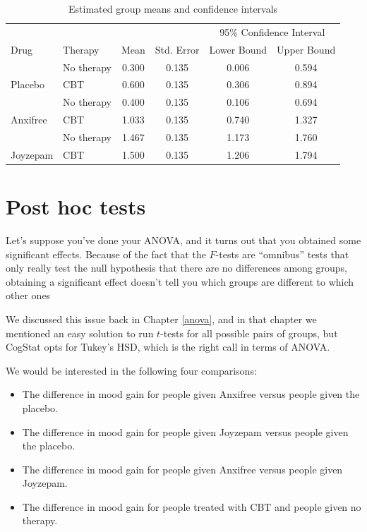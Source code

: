 \documentclass[
  11pt,
  a4paper,
  twoside,symmetric,openright]{book}
\providecommand{\tightlist}{%
  \setlength{\itemsep}{0pt}\setlength{\parskip}{0pt}}
\theoremstyle{break}
\theoremstyle{break}
\begin{document}
\begin{table}[!h]

\caption{\label{tab:unnamed-chunk-89}Estimated group means and confidence intervals}
\centering
\begin{tabular}[t]{llcccc}
\toprule
\multicolumn{1}{c}{ } & \multicolumn{1}{c}{ } & \multicolumn{1}{c}{ } & \multicolumn{1}{c}{ } & \multicolumn{2}{c}{95\% Confidence Interval} \\
\cmidrule(l{3pt}r{3pt}){5-6}
Drug & Therapy & Mean & Std. Error & Lower Bound & Upper Bound\\
\midrule
 & No therapy & 0.300 & 0.135 & 0.006 & 0.594\\

\multirow{-2}{*}{\raggedright\arraybackslash Placebo} & CBT & 0.600 & 0.135 & 0.306 & 0.894\\
\cmidrule{1-6}
 & No therapy & 0.400 & 0.135 & 0.106 & 0.694\\

\multirow{-2}{*}{\raggedright\arraybackslash Anxifree} & CBT & 1.033 & 0.135 & 0.740 & 1.327\\
\cmidrule{1-6}
 & No therapy & 1.467 & 0.135 & 1.173 & 1.760\\

\multirow{-2}{*}{\raggedright\arraybackslash Joyzepam} & CBT & 1.500 & 0.135 & 1.206 & 1.794\\
\bottomrule
\end{tabular}
\end{table}

\section{Post hoc tests}\label{posthoc2}

Let's suppose you've done your ANOVA, and it turns out that you obtained some significant effects. Because of the fact that the \(F\)-tests are ``omnibus'' tests that only really test the null hypothesis that there are no differences among groups, obtaining a significant effect doesn't tell you which groups are different to which other ones

We discussed this issue back in Chapter \ref{anova}, and in that chapter we mentioned an easy solution to run \(t\)-tests for all possible pairs of groups, but CogStat opts for Tukey's HSD, which is the right call in terms of ANOVA.

We would be interested in the following four comparisons:

\begin{itemize}
\tightlist
\item
  The difference in mood gain for people given Anxifree versus people given the placebo.
\item
  The difference in mood gain for people given Joyzepam versus people given the placebo.
\item
  The difference in mood gain for people given Anxifree versus people given Joyzepam.
\item
  The difference in mood gain for people treated with CBT and people given no therapy.
\end{itemize}
\end{document}
